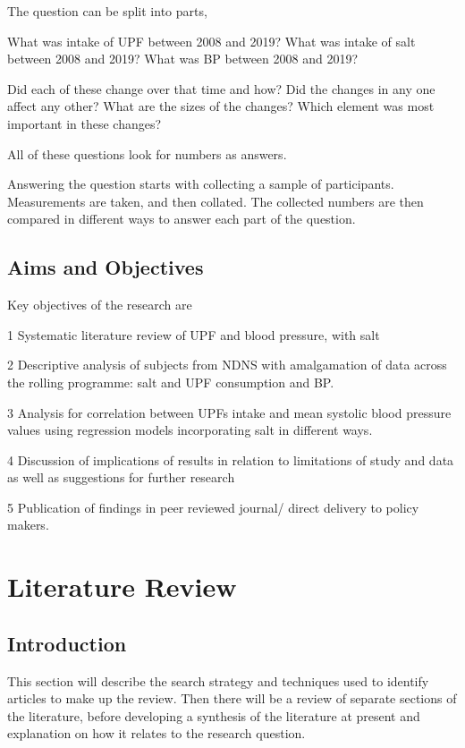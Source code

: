\documentclass[
]{article}
\begin{document}
The question can be split into parts,

What was intake of UPF between 2008 and 2019? What was intake of salt
between 2008 and 2019? What was BP between 2008 and 2019?

Did each of these change over that time and how? Did the changes in any
one affect any other? What are the sizes of the changes? Which element
was most important in these changes?

All of these questions look for numbers as answers.

Answering the question starts with collecting a sample of participants.
Measurements are taken, and then collated. The collected numbers are
then compared in different ways to answer each part of the question.

\hypertarget{aims-and-objectives}{%
\subsection{Aims and Objectives}\label{aims-and-objectives}}

Key objectives of the research are

1 Systematic literature review of UPF and blood pressure, with salt

2 Descriptive analysis of subjects from NDNS with amalgamation of data
across the rolling programme: salt and UPF consumption and BP.

3 Analysis for correlation between UPFs intake and mean systolic blood
pressure values using regression models incorporating salt in different
ways.

4 Discussion of implications of results in relation to limitations of
study and data as well as suggestions for further research

5 Publication of findings in peer reviewed journal/ direct delivery to
policy makers.

\newpage

\hypertarget{literature-review}{%
\section{Literature Review}\label{literature-review}}

\hypertarget{introduction-1}{%
\subsection{Introduction}\label{introduction-1}}

This section will describe the search strategy and techniques used to
identify articles to make up the review. Then there will be a review of
separate sections of the literature, before developing a synthesis of
the literature at present and explanation on how it relates to the
research question.
\end{document}

